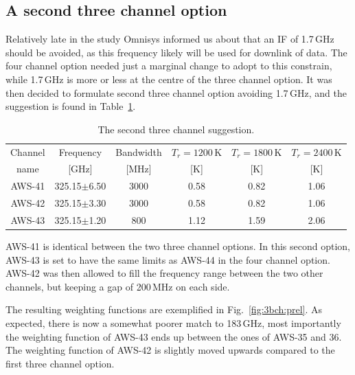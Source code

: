 \documentclass[12pt]{article}
\begin{document}
\subsection{A second three channel option}
%
Relatively late in the study Omnisys informed us about that an IF of 1.7\,GHz
should be avoided, as this frequency likely will be used for downlink of data.
The four channel option needed just a marginal change to adopt to this
constrain, while 1.7\,GHz is more or less at the centre of the three channel
option. It was then decided to formulate second three channel option avoiding 
1.7\,GHz, and the suggestion is found in Table~\ref{tab:chs:3b}.

\begin{table}[!h]
  \centering  
  \begin{tabular}[c]{c|c|c|ccc}
    Channel & Frequency   & Bandwidth & $T_r=1200$\,K
    & $T_r=1800$\,K & $T_r=2400$\,K\\
    name    & [GHz] &  [MHz] & [K]  & [K] & [K]\\
    \hline
    AWS-41  & 325.15$\pm$6.50 & 3000  & 0.58 & 0.82 & 1.06\\
    AWS-42  & 325.15$\pm$3.30 & 3000  & 0.58 & 0.82 & 1.06\\
    AWS-43  & 325.15$\pm$1.20 & \phantom{0}800 & 1.12 & 1.59 & 2.06\\
    \hline
  \end{tabular}
  \caption{The second three channel suggestion.}
  \label{tab:chs:3b}
\end{table}

AWS-41 is identical between the two three channel options. In this second
option, AWS-43 is set to have the same limits as AWS-44 in the four channel
option. AWS-42 was then allowed to fill the frequency range between the two
other channels, but keeping a gap of 200\,MHz on each side.

The resulting weighting functions are exemplified in Fig.~\ref{fig:3bch:prel}.
As expected, there is now a somewhat poorer match to 183\,GHz, most importantly
the weighting function of AWS-43 ends up between the ones of AWS-35 and 36. The
weighting function of AWS-42 is slightly moved upwards compared to the first
three channel option.
\end{document}
